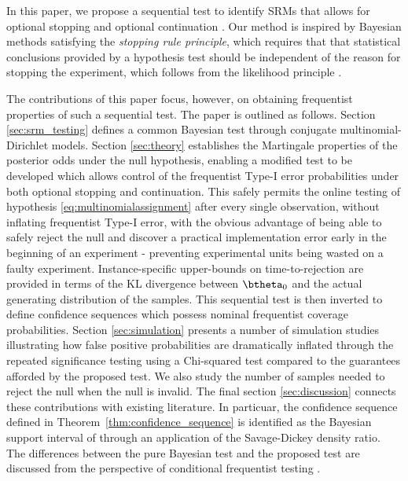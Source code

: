 \documentclass[11pt]{article}
\begin{document}
In this paper, we propose a sequential test to identify SRMs that allows for optional stopping and optional continuation .
Our method is inspired by Bayesian methods satisfying the \textit{stopping rule principle}, which requires that that statistical conclusions provided by a hypothesis test should be independent of the reason for stopping the experiment, which follows from the likelihood principle \citep{likelihood}.

The contributions of this paper focus, however, on obtaining frequentist properties of such a sequential test.
The paper is outlined as follows.
Section \ref{sec:srm_testing} defines a common Bayesian test through conjugate multinomial-Dirichlet models.
Section \ref{sec:theory} establishes the Martingale properties of the posterior odds under the null hypothesis, enabling a modified test to be developed which allows control of the frequentist Type-I error probabilities under both optional stopping and continuation.
This safely permits the online testing of hypothesis \eqref{eq:multinomialassignment} after every single observation, without inflating frequentist Type-I error, with the obvious advantage of being able to safely reject the null and discover a practical implementation error early in the beginning of an experiment - preventing experimental units being wasted on a faulty experiment.
Instance-specific upper-bounds on time-to-rejection are provided in terms of the KL divergence  between $\btheta_0$ and the actual generating distribution of the samples.
This sequential test is then inverted to define confidence sequences which possess nominal frequentist coverage probabilities.
Section \ref{sec:simulation} presents a number of simulation studies illustrating how false positive probabilities are dramatically inflated through the repeated significance testing using a Chi-squared test compared to the guarantees afforded by the proposed test.
We also study the number of samples needed to reject the null when the null is invalid.
The final section \ref{sec:discussion} connects these contributions with existing literature.
In particuar, the confidence sequence defined in Theorem~\ref{thm:confidence_sequence} is identified as the Bayesian support interval of \cite{support_interval} through an application of the Savage-Dickey density ratio.
The differences between the pure Bayesian test and the proposed test are discussed from the perspective of conditional frequentist testing \citep{conditional_frequentist_simple, conditional_frequentist_precise, conditional_frequentist_composite}.
\end{document}
